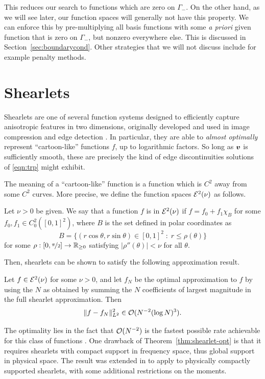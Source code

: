 This reduces our search to functions which are zero on $\Gamma_-$. On the other hand, as we will see later,
our function spaces will generally not have this property. We can enforce this by pre-multiplying all basis
functions with some {\em a priori} given function that is zero on $\Gamma_-$, but nonzero everywhere else.
This is discussed in Section~\ref{sec:boundarycond}. Other strategies that we will not discuss include for
example penalty methods.

\section{Shearlets}

Shearlets are one of several function systems designed to efficiently capture anisotropic features in two
dimensions, originally developed and used in image compression and edge detection \cite{Labate05, Easley08}.
In particular, they are able to {\em almost optimally} represent ``cartoon-like'' functions $f$, up to
logarithmic factors. So long as ${\bm v}$ is sufficiently smooth, these are precisely the kind of edge
discontinuities solutions of \eqref{eqn:trp} might exhibit.

The meaning of a ``cartoon-like'' function is a function which is $C^2$ away from some $C^2$ curves. More
precise, we define the function spaces $\mathcal{E}^2(\nu)$ as follows.
\begin{definition}
Let $\nu>0$ be given. We say that a function $f$ is in $\mathcal{E}^2(\nu)$ if $f = f_0 + f_1\chi_B$ for some $f_0,
f_1 \in C^2_0([0,1]^2)$, where $B$ is the set defined in polar coordinates as
\[
    B = \{ (r\cos\theta,r\sin\theta) \in [0,1]^2 \;:\; r \leq \rho(\theta) \}
\]
for some $\rho :  [0,\nicefrac{\pi}{2}] \to \mathbb{R}_{\geq0}$ satisfying $|\rho''(\theta)| < \nu$ for all $\theta$.
\end{definition}
Then, shearlets can be shown to satisfy the following approximation result.
\begin{theorem} \label{thm:shearlet-opt}
Let $f\in\mathcal{E}^2(\nu)$ for some $\nu>0$, and let $f_N$ be the optimal approximation to $f$ by using the $N$ as
obtained by summing the $N$ coefficients of largest magnitude in the full shearlet approximation. Then
\[
    \|f-f_N\|_{L^2}^2 \in \mathcal{O}(N^{-2} (\log N)^3).
\]
\end{theorem}
The optimality lies in the fact that $\mathcal{O}(N^{-2})$ is the fastest possible rate achievable for this class of
functions \cite{Donoho01}. One drawback of Theorem~\ref{thm:shearlet-opt} is that it requires shearlets with
compact support in frequency space, thus global support in physical space. The result was extended in
\cite{Kutyniok11} to apply to physically compactly supported shearlets, with some additional restrictions on
the moments.

